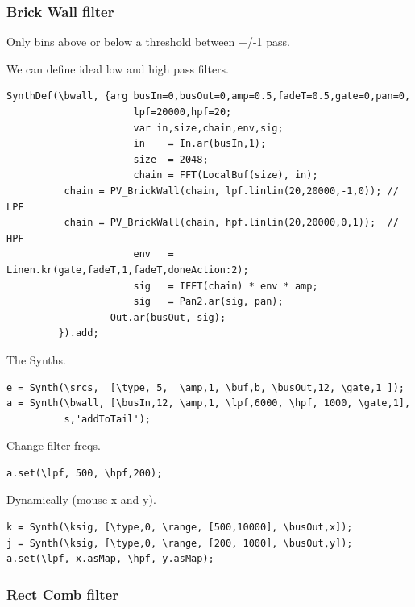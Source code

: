 \subsubsection{Brick Wall filter}\label{brickwall-filter}

Only bins above or below a threshold between +/-1 pass.

We can define ideal low and high pass filters.

\begin{lstlisting}[frame=single, caption=Brick Wall spectral filter model] 
SynthDef(\bwall, {arg busIn=0,busOut=0,amp=0.5,fadeT=0.5,gate=0,pan=0,
                      lpf=20000,hpf=20;
                      var in,size,chain,env,sig;
                      in    = In.ar(busIn,1);
                      size  = 2048;
                      chain = FFT(LocalBuf(size), in);
          chain = PV_BrickWall(chain, lpf.linlin(20,20000,-1,0)); // LPF
          chain = PV_BrickWall(chain, hpf.linlin(20,20000,0,1));  // HPF
                      env   = Linen.kr(gate,fadeT,1,fadeT,doneAction:2);
                      sig   = IFFT(chain) * env * amp;
                      sig   = Pan2.ar(sig, pan);
                  Out.ar(busOut, sig);
         }).add;
\end{lstlisting}

The Synths.

\begin{lstlisting}[frame=single] 
e = Synth(\srcs,  [\type, 5,  \amp,1, \buf,b, \busOut,12, \gate,1 ]);
a = Synth(\bwall, [\busIn,12, \amp,1, \lpf,6000, \hpf, 1000, \gate,1],
          s,'addToTail');
\end{lstlisting}

Change filter freqs.

\begin{lstlisting}[frame=single] 
a.set(\lpf, 500, \hpf,200);
\end{lstlisting}

Dynamically (mouse x and y).

\begin{lstlisting}[frame=single] 
k = Synth(\ksig, [\type,0, \range, [500,10000], \busOut,x]);
j = Synth(\ksig, [\type,0, \range, [200, 1000], \busOut,y]);
a.set(\lpf, x.asMap, \hpf, y.asMap);
\end{lstlisting}

\subsubsection{Rect Comb filter}\label{rect-comb-filter}

